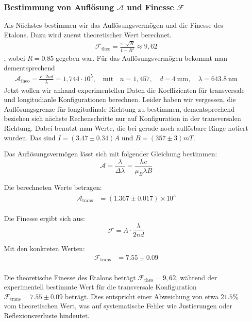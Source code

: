 \subsubsection{Bestimmung von Auflösung $\mathcal{A}$ und Finesse $\mathcal{F}$}
Als Nächstes bestimmen wir das Auflösungsvermögen und die Finesse des Etalons. Dazu wird zuerst theoretischer Wert berechnet. \begin{align}
\mathcal{F}_{\text{theo}} = \frac{\pi \cdot \sqrt{R}}{1 - R^2} \approx 9{,}62
\end{align}
, wobei $R=0.85$ gegeben war. Für das Auflösungsvermögen bekommt man dementsprechend \begin{align}
\mathcal{A}_{\text{theo}} = \frac{F \cdot 2nd}{\lambda} = 1{,}744 \cdot 10^{5}, \quad \text{mit} \quad n = 1{,}457, \quad d = \SI{4}{\milli\meter}, \quad \lambda = \SI{643,8}{\nano\meter}
\end{align}
Jetzt wollen wir anhand experimentellen Daten die Koeffizienten für transversale und longitudianle Konfigurationen berechnen. Leider haben wir vergessen, die Auflösungsgrenze für longitudinale Richtung zu bestimmen, dementsprechend beziehen sich nächste Rechenschritte nur auf Konfiguration in der transversalen Richtung.  Dabei benutzt man Werte, die bei gerade noch auflösbare Ringe notiert wurden. Das sind $I=(3.47\pm0.34) A$
und $B = (357\pm 3) mT$.

Das Auflösungsvermögen lässt sich mit folgender Gleichung\cite{Dem17} bestimmen:
\begin{equation}
\mathcal{A} = \frac{\lambda}{\Delta\lambda} = \frac{hc}{\mu_B \lambda B}
\end{equation}

Die berechneten Werte betragen:
\begin{align}
\mathcal{A}_{\text{trans}} &= (1.367\pm0.017 ) \times 10^5 \\
\end{align}

Die Finesse\cite{Dem17} ergibt sich aus:
\begin{equation}
\mathcal{F} = A \cdot \frac{\lambda}{2nd}
\end{equation}

Mit den konkreten Werten:
\begin{align}
\mathcal{F}_{\text{trans}} &= 7.55\pm0.09  \\
\end{align}

Die theoretische Finesse des Etalons beträgt \(\mathcal{F}_{\text{theo}} = 9{,}62\), während der experimentell bestimmte Wert für die transversale Konfiguration \(\mathcal{F}_{\text{trans}} = 7.55 \pm 0.09\) beträgt. Dies entspricht einer Abweichung von etwa $21.5\%$ vom theoretischen Wert, was auf systematische Fehler wie Justierungen oder Reflexionsverluste hindeutet.

